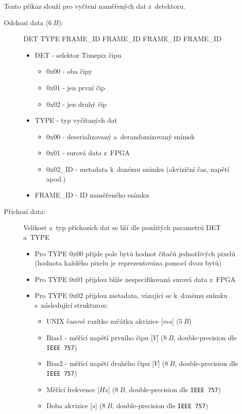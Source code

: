 \begin{description}
		Tento příkaz slouží pro vyčtení naměřených dat z~detektoru.
		\begin{description}
			\item[Odchozí data ($6~B$):] DET TYPE FRAME\_ID FRAME\_ID FRAME\_ID FRAME\_ID
				\begin{itemize}
					\item DET - selektor Timepix čipu
						\begin{itemize}
							\item 0x00 - oba čipy
							\item 0x01 - jen první čip
							\item 0x02 - jen druhý čip
						\end{itemize}
					\item TYPE - typ vyčítaných dat
						\begin{itemize}
							\item 0x00 - deserializovaný a~derandomizovaný snímek
							\item 0x01 - surová data z~FPGA
							\item 0x02\_ID - metadata k~danému snímku (akviziční čas, napětí apod.)
						\end{itemize}
					\item FRAME\_ID - ID naměřeného snímku
				\end{itemize}
			\item[Příchozí data:] Velikost a~typ příchozích dat se liší dle použitých parametrů DET a~TYPE
				\begin{itemize}
					\item Pro TYPE 0x00 přijde pole bytů hodnot čítačů jednotlivých pixelů (hodnota každého pixelu je reprezentována pomocí dvou bytů)
					\item Pro TYPE 0x01 přijdou blíže nespecifikovaná surová data z~FPGA
					\item Pro TYPE 0x02 přijdou metadata, vázající se k~danému snímku s~následující strukturou:
						\begin{itemize}
							\item UNIX časové razítko začátku akvizice [$ms$] ($5~B$)
							\item Bias1 - měřící napětí prvního čipu [$V$] ($8~B$, double-precision dle \texttt{IEEE 757})
							\item Bias2 - měřící napětí druhého čipu [$V$] ($8~B$, double-precision dle \texttt{IEEE 757})
							\item Měřící frekvence [$Hz$] ($8~B$, double-precision dle \texttt{IEEE 757})
							\item Doba akvizice [$s$] ($8~B$, double-precision dle \texttt{IEEE 757})
						\end{itemize}	


\end{itemize}
\end{description}
\end{description}

